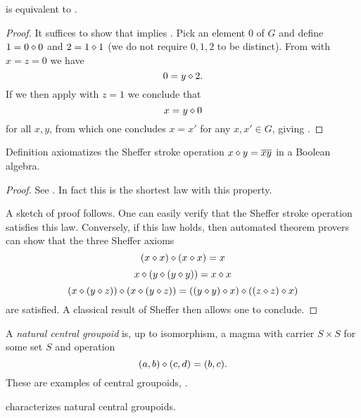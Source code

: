 \begin{theorem}[953 is equivalent to 2]\label{953_equiv_2}\leanok  {} is equivalent to .
\end{theorem}

\begin{proof}\leanok  It suffices to show that  implies .  Pick an element $0$ of $G$ and define $1 = 0 \diamond 0$ and $2 = 1 \diamond 1$ (we do not require $0,1,2$ to be distinct).
From  with $x=z=0$ we have
$$ 0 = y \diamond 2.$$
If we then apply  with $z=1$ we conclude that
$$ x = y \diamond 0$$
for all $x,y$, from which one concludes $x=x'$ for any $x,x' \in G$, giving .
\end{proof}


\begin{theorem}\label{sheffer}\leanok  Definition 
axiomatizes the Sheffer stroke operation $x \diamond y = \overline{xy}$ in a Boolean algebra.
\end{theorem}

\begin{proof}\leanok
See \cite{mccune_et_al}.  In fact this is the shortest law with this property.

A sketch of proof follows.  One can easily verify that the Sheffer stroke operation satisfies this law.  Conversely, if this law holds, then automated theorem provers can show that the three Sheffer axioms
$$ (x \diamond x) \diamond (x \diamond x)  = x$$
$$ x \diamond (y \diamond (y \diamond y)) = x \diamond x$$
$$ (x \diamond (y \diamond z)) \diamond (x \diamond (y \diamond z)) = ((y \diamond y) \diamond x) \diamond ((z \diamond z) \diamond x)$$
are satisfied.  A classical result of Sheffer \cite{sheffer} then allows one to conclude.
\end{proof}

A \emph{natural central groupoid} is, up to isomorphism, a magma with carrier $S \times S$ for some set $S$ and operation
$$ (a,b) \diamond (c,d) = (b,c).$$
These are examples of central groupoids, .

\begin{theorem}\label{natural-central-groupoid}  characterizes natural central groupoids.
\end{theorem}

